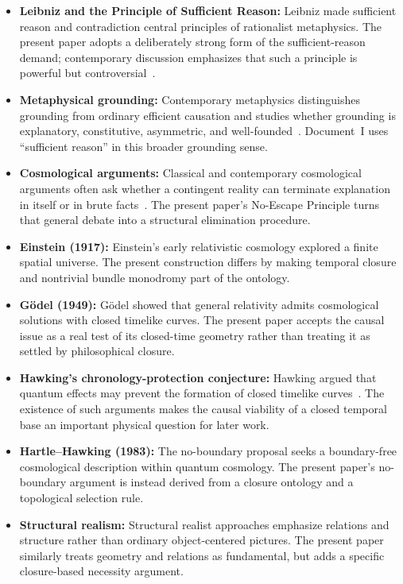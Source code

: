 \documentclass[11pt]{article}
\theoremstyle{canonstyle}
\begin{document}
\begin{itemize}
    \item \textbf{Leibniz and the Principle of Sufficient Reason:} Leibniz made sufficient reason and contradiction central principles of rationalist metaphysics. The present paper adopts a deliberately strong form of the sufficient-reason demand; contemporary discussion emphasizes that such a principle is powerful but controversial~\cite{SEPPSR}.
    \item \textbf{Metaphysical grounding:} Contemporary metaphysics distinguishes grounding from ordinary efficient causation and studies whether grounding is explanatory, constitutive, asymmetric, and well-founded~\cite{SEPGrounding}. Document~I uses ``sufficient reason'' in this broader grounding sense.
    \item \textbf{Cosmological arguments:} Classical and contemporary cosmological arguments often ask whether a contingent reality can terminate explanation in itself or in brute facts~\cite{CosmoArg}. The present paper's No-Escape Principle turns that general debate into a structural elimination procedure.
    \item \textbf{Einstein (1917):} Einstein's early relativistic cosmology explored a finite spatial universe. The present construction differs by making temporal closure and nontrivial bundle monodromy part of the ontology.
    \item \textbf{G\"odel (1949):} G\"odel showed that general relativity admits cosmological solutions with closed timelike curves. The present paper accepts the causal issue as a real test of its closed-time geometry rather than treating it as settled by philosophical closure.
    \item \textbf{Hawking's chronology-protection conjecture:} Hawking argued that quantum effects may prevent the formation of closed timelike curves~\cite{HawkingChronology}. The existence of such arguments makes the causal viability of a closed temporal base an important physical question for later work.
    \item \textbf{Hartle--Hawking (1983):} The no-boundary proposal seeks a boundary-free cosmological description within quantum cosmology. The present paper's no-boundary argument is instead derived from a closure ontology and a topological selection rule.
    \item \textbf{Structural realism:} Structural realist approaches emphasize relations and structure rather than ordinary object-centered pictures. The present paper similarly treats geometry and relations as fundamental, but adds a specific closure-based necessity argument.
\end{itemize}
\end{document}
